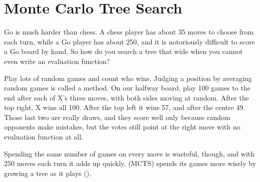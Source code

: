 \section{Monte Carlo Tree Search}

Go is much harder than chess. A chess player has about 35 moves to choose from each turn, while a Go player has about 250, and it is notoriously difficult to score a Go board by hand. So how do you search a tree that wide when you cannot even write an evaluation function?

Play lots of random games and count who wins. Judging a position by averaging random games is called a  method. On our halfway board, play 100 games to the end after each of X's three moves, with both sides moving at random. After the top right, X wins all 100. After the top left it wins 57, and after the centre 49. Those last two are really draws, and they score well only because random opponents make mistakes, but the votes still point at the right move with no evaluation function at all.

Spending the same number of games on every move is wasteful, though, and with 250 moves each turn it adds up quickly.  (MCTS) spends its games more wisely by growing a tree as it plays ().

